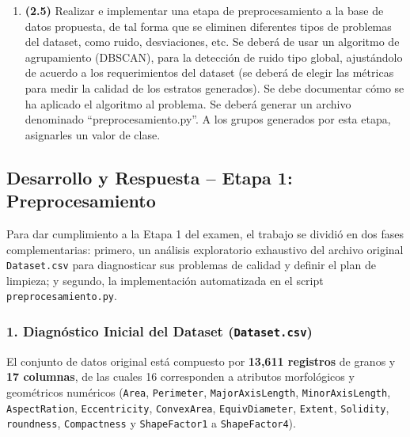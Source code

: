 \documentclass[12pt,a4paper]{article}
\begin{document}
\vspace{0.4cm}

\begin{enumerate}[leftmargin=1.1cm, label=\textbf{\arabic*.}]
    \item \textbf{(2.5)} Realizar e implementar una etapa de preprocesamiento a la base de datos propuesta, de tal forma que se eliminen diferentes tipos de problemas del dataset, como ruido, desviaciones, etc. Se deberá de usar un algoritmo de agrupamiento (DBSCAN), para la detección de ruido tipo global, ajustándolo de acuerdo a los requerimientos del dataset (se deberá de elegir las métricas para medir la calidad de los estratos generados). Se debe documentar cómo se ha aplicado el algoritmo al problema. Se deberá generar un archivo denominado ``preprocesamiento.py''. A los grupos generados por esta etapa, asignarles un valor de clase.
\end{enumerate}

\subsection*{Desarrollo y Respuesta -- Etapa 1: Preprocesamiento}

Para dar cumplimiento a la Etapa 1 del examen, el trabajo se dividió en dos fases complementarias: primero, un análisis exploratorio exhaustivo del archivo original \texttt{Dataset.csv} para diagnosticar sus problemas de calidad y definir el plan de limpieza; y segundo, la implementación automatizada en el script \texttt{preprocesamiento.py}.

\subsubsection*{1. Diagnóstico Inicial del Dataset (\texttt{Dataset.csv})}

El conjunto de datos original está compuesto por \textbf{13,611 registros} de granos y \textbf{17 columnas}, de las cuales 16 corresponden a atributos morfológicos y geométricos numéricos (\texttt{Area}, \texttt{Perimeter}, \texttt{MajorAxisLength}, \texttt{MinorAxisLength}, \texttt{AspectRation}, \texttt{Eccentricity}, \texttt{ConvexArea}, \texttt{EquivDiameter}, \texttt{Extent}, \texttt{Solidity}, \texttt{roundness}, \texttt{Compactness} y \texttt{ShapeFactor1} a \texttt{ShapeFactor4}).
\end{document}
